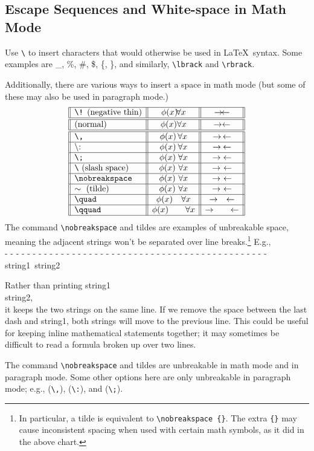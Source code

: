 \documentclass{article} 		%
\begin{document}
\subsection{Escape Sequences and White-space in Math Mode} \label{subsec:escape}
Use \verb$\$ to insert characters that would otherwise be used in \LaTeX\ syntax. Some examples are \_, \%, \#, \$, \{, \}, and similarly, \verb$\lbrack$ and \verb$\rbrack$. \par
Additionally, there are various ways to insert a space in math mode (but some of these may also be used in paragraph mode.) 
\[
	\begin{array}{||l||c||c||}
	\hline \text{\texttt{\textbackslash !} (negative thin)} & \phi(x) \!\forall x & \rightarrow\!\leftarrow \\ \hline\hline
	\text{(normal)} & \phi(x) \forall x & \rightarrow\leftarrow \\ \hline\hline
	\texttt{\textbackslash ,} & \phi(x)\,\forall x & \rightarrow\,\leftarrow \\ \hline
	\text{\textbackslash :} & \phi(x)\:\forall x & \rightarrow\:\leftarrow \\ \hline
	\texttt{\textbackslash ;} & \phi(x)\;\forall x & \rightarrow\;\leftarrow \\ \hline
	\text{\texttt{\textbackslash} (slash space)} & \phi(x)\ \forall x & \rightarrow \ \leftarrow\\ \hline
	\texttt{\textbackslash nobreakspace} & \phi(x)\nobreakspace\forall x & \rightarrow\nobreakspace\leftarrow \\ \hline
	\sim \text{ (tilde)} & \phi(x)~\forall x & \rightarrow~\leftarrow \\ \hline
	\texttt{\textbackslash quad} & \phi(x) \quad \forall x & \rightarrow \quad \leftarrow \\ \hline
	\texttt{\textbackslash qquad} & \phi(x) \qquad \forall x & \rightarrow \qquad \leftarrow \\ \hline
	\end{array}
\]
The command \verb$\nobreakspace$ and tildes are examples of unbreakable space, meaning the adjacent strings won't be separated over line breaks.\footnote{
	In particular, a tilde is equivalent to \texttt{\textbackslash nobreakspace \{\}}. The extra \texttt{\{\}} may cause inconsistent spacing when used with certain math symbols, as it did in the above chart. 
}
E.g.,\\
- - - - - - - - - - - - - - - - - - - - - - - - - - - - - - - - - - - - - - - - - - - - - - - string1~string2 \par
Rather than printing \hspace*{\fill} string1 \\
string2, \\
it keeps the two strings on the same line. If we remove the space between the last dash and string1, both strings will move to the previous line. This could be useful for keeping inline mathematical statements together; it may sometimes be difficult to read a formula broken up over two lines. \par
The command \verb$\nobreakspace$ and tildes are unbreakable in math mode and in paragraph mode. Some other options here are only unbreakable in paragraph mode; e.g., (\verb$\,$), (\verb$\:$), and (\verb$\;$). 
\end{document}
